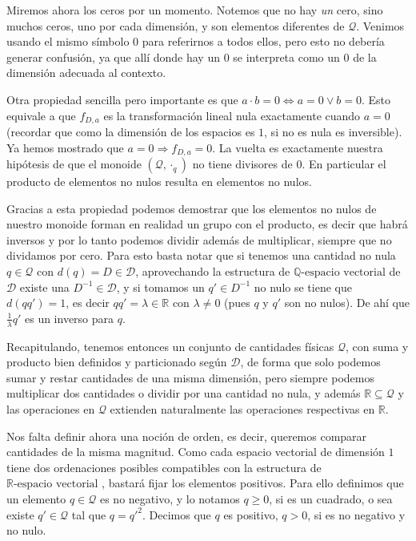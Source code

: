 \documentclass{article}
\def\rev{$\mathbb{R} \mbox{-espacio vectorial } $}
\def\qev{$\mathbb{Q} \mbox{-espacio vectorial } $}
\def\Dimensions{\mathcal D}
\def\Quantities{\mathcal Q}
\begin{document}
Miremos ahora los ceros por un momento. Notemos que no hay \textit{un} cero, sino muchos ceros, uno por cada dimensión, y son
elementos diferentes de $\Quantities$. Venimos usando el mismo símbolo $0$ para referirnos a todos ellos, pero esto no debería
generar confusión, ya que allí donde hay un $0$ se interpreta como un $0$ de la dimensión adecuada al contexto.

Otra propiedad sencilla pero importante es que $a \cdot b = 0 \Leftrightarrow a = 0 \lor b = 0$. Esto equivale a que
$f_{D,a}$ es la transformación lineal nula exactamente cuando $a = 0$ (recordar que como la dimensión de los espacios es $1$,
si no es nula es inversible). Ya hemos mostrado que $a = 0 \Rightarrow f_{D,a} = 0$. La vuelta es exactamente nuestra
hipótesis de que el monoide $(\Quantities, \cdot_q)$ no tiene divisores de $0$. En particular el producto de elementos no nulos
resulta en elementos no nulos.

Gracias a esta propiedad podemos demostrar que los elementos no nulos de nuestro monoide forman en realidad un grupo con el producto, es decir
que habrá inversos y por lo tanto podemos dividir además de multiplicar, siempre que no dividamos por cero. Para esto basta notar
que si tenemos una cantidad no nula $q \in \Quantities$ con $d(q) = D \in \Dimensions$, aprovechando la estructura de \qev de $\Dimensions$
existe una $D^{-1} \in \Dimensions$, y si tomamos un $q' \in D^{-1}$ no nulo se tiene que $d(q q') = 1$, es decir
$q q' = \lambda \in \mathbb{R}$ con $\lambda \neq 0$ (pues $q$ y $q'$ son no nulos). De ahí que $\frac{1}{\lambda} q'$ es un
inverso para $q$.

Recapitulando, tenemos entonces un conjunto de cantidades físicas $\Quantities$, con suma y producto bien definidos y particionado
según $\Dimensions$, de forma que solo podemos sumar y restar cantidades de una misma dimensión, pero siempre podemos multiplicar
dos cantidades o dividir por una cantidad no nula, y además $\mathbb{R} \subseteq \Quantities$ y las operaciones en $\Quantities$
extienden naturalmente las operaciones respectivas en $\mathbb{R}$. 

Nos falta definir ahora una noción de orden, es decir,
queremos comparar cantidades de la misma magnitud. Como cada espacio vectorial de dimensión $1$ tiene dos ordenaciones posibles
compatibles con la estructura de \rev, bastará fijar los elementos positivos. Para ello definimos que un elemento
$q \in \Quantities$ es no negativo, y lo notamos $q \geq 0$, si es un cuadrado, o sea existe $q' \in \Quantities$ tal que
$q = q'^2$. Decimos que $q$ es positivo, $q > 0$, si es no negativo y no nulo.
\end{document}
